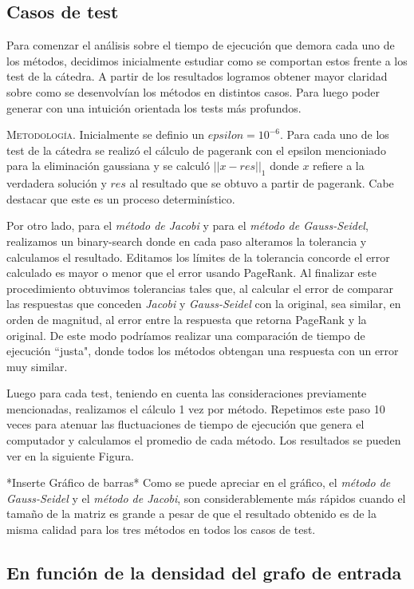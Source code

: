 \subsection{Casos de test}

Para comenzar el análisis sobre el tiempo de ejecución que demora cada uno de los métodos, decidimos inicialmente estudiar como se comportan estos frente a los test de la cátedra. A partir de los resultados logramos obtener mayor claridad sobre como se desenvolvían los métodos en distintos casos. Para luego poder generar con una intuición orientada los tests más profundos.

\vspace{2em}
\noindent\textsc{Metodología}. Inicialmente se definio un $epsilon = 10^{-6}$. Para cada uno de los test de la cátedra se realizó el cálculo de pagerank con el epsilon mencioniado para la eliminación gaussiana y se calculó $||x - res||_1$ donde $x$ refiere a la verdadera solución y $res$ al resultado que se obtuvo a partir de pagerank. Cabe destacar que este es un proceso determinístico. 

\vspace{2em}

Por otro lado, para el \textit{método de Jacobi} y para el \textit{método de Gauss-Seidel}, realizamos un binary-search donde en cada paso alteramos la tolerancia y calculamos el resultado. Editamos los límites de la tolerancia concorde el error calculado es mayor o menor que el error usando PageRank. Al finalizar este procedimiento obtuvimos tolerancias tales que, al calcular el error de comparar las respuestas que conceden \textit{Jacobi} y \textit{Gauss-Seidel} con la original, sea similar, en orden de magnitud, al error entre la respuesta que retorna PageRank y la original. De este modo podríamos realizar una comparación de tiempo de ejecución ``justa", donde todos los métodos obtengan una respuesta con un error muy similar.

\vspace{2em}

Luego para cada test, teniendo en cuenta las consideraciones previamente mencionadas, realizamos el cálculo 1 vez por método. Repetimos este paso 10 veces para atenuar las fluctuaciones de tiempo de ejecución que genera el computador y calculamos el promedio de cada método. Los resultados se pueden ver en la siguiente Figura. 

\vspace{2em}
*Inserte Gráfico de barras*
Como se puede apreciar en el gráfico, el \textit{método de Gauss-Seidel} y el \textit{método de Jacobi}, son considerablemente más rápidos cuando el tamaño de la matriz es grande a pesar de que el resultado obtenido es de la misma calidad para los tres métodos en todos los casos de test.

\vspace{2em}
\subsection{En función de la densidad del grafo de entrada}
